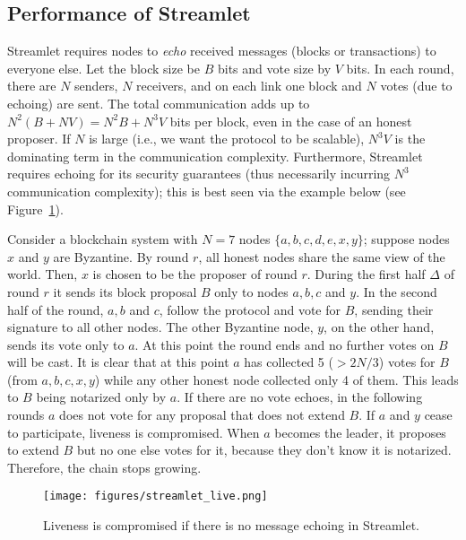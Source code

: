 \documentclass{article}
\begin{document}
\subsection*{Performance of Streamlet}

 Streamlet requires nodes to {\em echo} received messages (blocks or transactions) to everyone else. Let the block size be $B$ bits and vote size by $V$ bits. In each round, there are $N$ senders, $N$ receivers, and on each link one block and $N$ votes (due to echoing) are sent. The total communication adds up to $N^2(B+NV) = N^2 B + N^3 V$ bits per block, even in the case of an honest proposer. If $N$ is large (i.e., we want the protocol to be scalable), $N^3 V$ is the dominating term in the communication complexity.  Furthermore,  Streamlet requires echoing for its security guarantees (thus necessarily incurring $N^3$ communication complexity); this is best seen via the  example below (see Figure~\ref{fig:streamlet_live}).

Consider a blockchain system with $N=7$ nodes $\{a,b,c,d,e,x,y\}$; suppose   nodes $x$ and $y$ are Byzantine. By round $r$, all honest nodes share the same view of the world. Then, $x$ is chosen to be the proposer of round $r$. During the first half $\Delta$ of round $r$ it sends its block proposal $B$ only to nodes $a,b,c$ and $y$. In the second half of the round, $a,b$ and $c$, follow the protocol and vote for $B$, sending their signature to all other nodes. The other Byzantine node, $y$, on the other hand, sends its vote only to $a$. At this point the round ends and no further votes on $B$ will be cast. It is clear that at this point $a$ has collected 5 ($> 2N/3$) votes for $B$ (from $a,b,c,x,y$) while any other honest node collected only 4 of them. This leads to $B$ being notarized only by $a$.
If there are no vote echoes, in the following rounds $a$ does not vote for any proposal that does not extend $B$. If $a$ and $y$ cease to participate, liveness is compromised. When $a$ becomes the leader, it proposes to extend $B$ but no one else votes for it, because they don’t know it is notarized. Therefore, the chain stops growing.

\begin{figure}
    \centering
    \texttt{[image: figures/streamlet\_live.png]}
    \caption{Liveness is compromised if there is no message echoing in Streamlet.}
    \label{fig:streamlet_live}
\end{figure}
\end{document}
